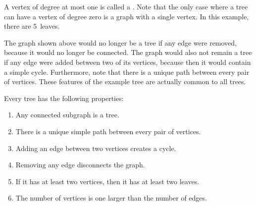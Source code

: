 
A vertex of degree at most one is called a .  Note that the only
case where a tree can have a vertex of degree zero is a graph with a single
vertex.  In this example, there are 5~leaves.

The graph shown above would no longer be a tree if any edge were removed,
because it would no longer be connected.  The graph would also not remain
a tree if any edge were added between two of its vertices, because then it
would contain a simple cycle.  Furthermore, note that there is a unique
path between every pair of vertices.  These features of the example tree
are actually common to all trees.

\begin{theorem}\label{th:treeprops}
Every tree has the following properties:
\begin{enumerate}
\item Any connected subgraph is a tree.
\item There is a unique simple path between every pair of vertices.
\item Adding an edge between two vertices creates a cycle.
\item Removing any edge disconnects the graph.
\item If it has at least two vertices, then it has at least two leaves.
\item The number of vertices is one larger than the number of edges.
\end{enumerate}
\end{theorem}

